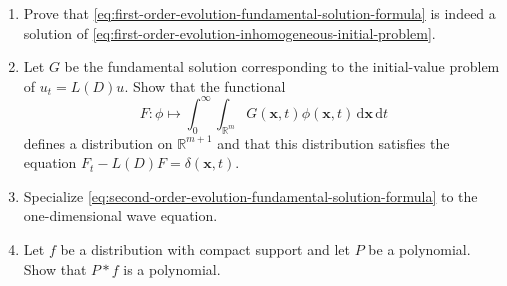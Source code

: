 \begin{enumerate}[label=\thesection.\arabic*.,ref=\thesection.\arabic*,start=33,series=book-problems]
\item\label{ex:inhomogeneous-fundamental-solution-formula} Prove that \eqref{eq:first-order-evolution-fundamental-solution-formula} is indeed a solution of \eqref{eq:first-order-evolution-inhomogeneous-initial-problem}.

\item\label{ex:evolution-fundamental-spacetime-delta} Let $G$ be the fundamental solution corresponding to the initial-value problem of $u_t=L(D)u$. Show that the functional
\begin{equation}\label{eq:evolution-fundamental-solution-spacetime-functional}
F:\phi\mapsto\int_0^\infty\int_{\mathbb{R}^m}G(\bm{x},t)\phi(\bm{x},t)\,\mathrm{d}\bm{x}\,\mathrm{d}t
\end{equation}
defines a distribution on $\mathbb{R}^{m+1}$ and that this distribution satisfies the equation $F_t-L(D)F=\delta(\bm{x},t)$.

\item\label{ex:wave-one-dimensional-duhamel-formula} Specialize \eqref{eq:second-order-evolution-fundamental-solution-formula} to the one-dimensional wave equation.

\item\label{ex:polynomial-compact-distribution-convolution} Let $f$ be a distribution with compact support and let $P$ be a polynomial. Show that $P*f$ is a polynomial.

\end{enumerate}
